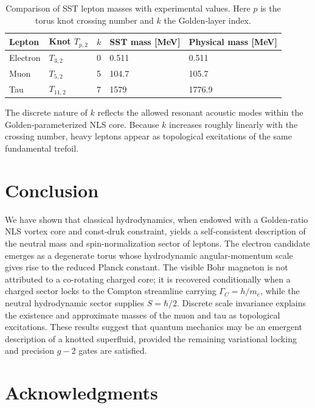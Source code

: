 \documentclass[11pt]{article}
\newcommand{\GammaC}{\Gamma_C}                                %
\begin{document}
\begin{table}[h]
    \centering
    \caption{Comparison of SST lepton masses with experimental values.  Here $p$ is the torus knot crossing number and $k$ the Golden‑layer index.}
    \begin{tabular}{@{}lllll@{}}
        \toprule
        Lepton & Knot $T_{p,2}$ & $k$ & SST mass [MeV] & Physical mass [MeV] \\
        \midrule
        Electron & $T_{3,2}$ & 0 & 0.511 & 0.511 \\
        Muon     & $T_{5,2}$ & 5 & 104.7 & 105.7 \\
        Tau      & $T_{11,2}$ & 7 & 1579  & 1776.9 \\
        \bottomrule
    \end{tabular}
    \label{tab:leptons}
\end{table}

The discrete nature of $k$ reflects the allowed resonant acoustic modes within the Golden‑parameterized NLS core.  Because $k$ increases roughly linearly with the crossing number, heavy leptons appear as topological excitations of the same fundamental trefoil.

\section{Conclusion}

We have shown that classical hydrodynamics, when endowed with a Golden‑ratio NLS vortex core and const‑druk constraint, yields a self‑consistent description of the neutral mass and spin-normalization sector of leptons.  The electron candidate emerges as a degenerate torus whose hydrodynamic angular-momentum scale gives rise to the reduced Planck constant.  The visible Bohr magneton is not attributed to a co-rotating charged core; it is recovered conditionally when a charged sector locks to the Compton streamline carrying $\GammaC=h/m_e$, while the neutral hydrodynamic sector supplies $S=\hbar/2$.  Discrete scale invariance explains the existence and approximate masses of the muon and tau as topological excitations.  These results suggest that quantum mechanics may be an emergent description of a knotted superfluid, provided the remaining variational locking and precision $g-2$ gates are satisfied.

\section*{Acknowledgments}
\end{document}
